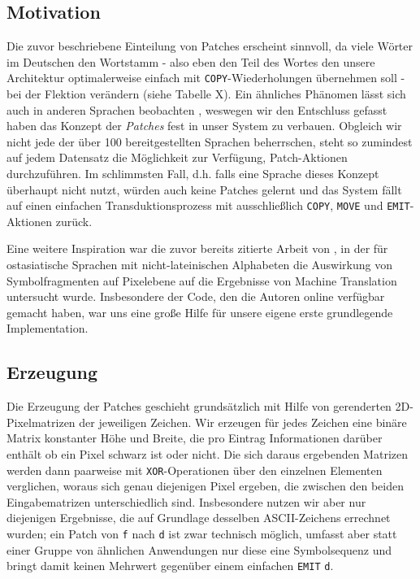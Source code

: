 \documentclass[a4paper]{article}
\newcommand{\action}[1]{\texttt{#1}}
\begin{document}
\subsection{Motivation}
Die zuvor beschriebene Einteilung von Patches erscheint sinnvoll, da viele Wörter im Deutschen den Wortstamm - also eben den Teil des Wortes den unsere Architektur optimalerweise einfach mit \action{COPY}-Wiederholungen übernehmen soll - bei der Flektion verändern (siehe Tabelle X).
Ein ähnliches Phänomen lässt sich auch in anderen Sprachen beobachten \citep{wiese:umlaut2009;kendris:cedilla2001}, weswegen wir den Entschluss gefasst haben das Konzept der \textit{Patches} fest in unser System zu verbauen. Obgleich wir nicht jede der über 100 bereitgestellten Sprachen beherrschen, steht so zumindest auf jedem Datensatz die Möglichkeit zur Verfügung, Patch-Aktionen durchzuführen. Im schlimmsten Fall, d.h. falls eine Sprache dieses Konzept überhaupt nicht nutzt, würden auch keine Patches gelernt und das System fällt auf einen einfachen Transduktionsprozess mit ausschließlich \action{COPY}, \action{MOVE} und \action{EMIT}-Aktionen zurück.

Eine weitere Inspiration war die zuvor bereits zitierte Arbeit von \citet{cjk-mt:LiuLLN17}, in der für ostasiatische Sprachen mit nicht-lateinischen Alphabeten die Auswirkung von Symbolfragmenten auf Pixelebene auf die Ergebnisse von Machine Translation untersucht wurde.
Insbesondere der Code, den die Autoren online verfügbar gemacht haben, war uns eine große Hilfe für unsere eigene erste grundlegende Implementation.

\subsection{Erzeugung}
Die Erzeugung der Patches geschieht grundsätzlich mit Hilfe von gerenderten 2D-Pixelmatrizen der jeweiligen Zeichen. Wir erzeugen für jedes Zeichen eine binäre Matrix konstanter Höhe und Breite, die pro Eintrag Informationen darüber enthält ob ein Pixel schwarz ist oder nicht.
Die sich daraus ergebenden Matrizen werden dann paarweise mit \texttt{XOR}-Operationen über den einzelnen Elementen verglichen, woraus sich genau diejenigen Pixel ergeben, die zwischen den beiden Eingabematrizen unterschiedlich sind. Insbesondere nutzen wir aber nur diejenigen Ergebnisse, die auf Grundlage desselben ASCII-Zeichens errechnet wurden; ein Patch von \texttt{f} nach \texttt{d} ist zwar technisch möglich, umfasst aber statt einer Gruppe von ähnlichen Anwendungen nur diese eine Symbolsequenz und bringt damit keinen Mehrwert gegenüber einem einfachen \action{EMIT} \texttt{d}.
\end{document}
